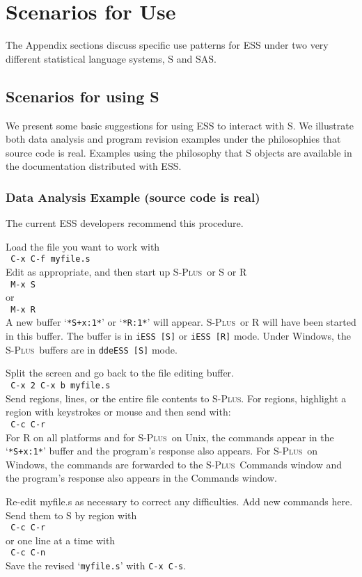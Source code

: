 \documentclass{article}
\newcommand*{\Splus}{\textsc{S-Plus}}
\newcommand{\stexttt}[1]{{\small\texttt{#1}}}
\newcommand{\elcode}[1]{\\{\stexttt{\hspace*{2em} #1}}\\}
\newcommand{\file}[1]{`\stexttt{#1}'}
\begin{document}


\appendix


\section{Scenarios for Use}
\label{app:scenarios}

The Appendix sections discuss specific use patterns for ESS under two very
different statistical language systems, S and SAS.

\subsection{Scenarios for using S}
\label{sec:S:scenarios}

We present some basic suggestions for using ESS to interact with S.
We illustrate both data analysis and program revision examples under
the philosophies that source code is real.
Examples using the philosophy that S objects are available in the documentation
distributed with ESS.

\subsubsection{Data Analysis Example (source code is real)}
The current ESS developers recommend this procedure.

\noindent
Load the file you want to work with
  \elcode{C-x C-f myfile.s}
Edit as appropriate, and then start up \Splus\ or S or R
  \elcode{M-x S}
or 
  \elcode{M-x R}
A new buffer \file{*S+x:1*} or \file{*R:1*} will appear.
\Splus\ or R will have been started
in this buffer.  The buffer is in \stexttt{iESS [S]} or \stexttt{iESS [R]} mode.
Under Windows, the \Splus\ buffers are in  \stexttt{ddeESS [S]} mode.

Split the screen and go back to the file editing buffer.
  \elcode{C-x 2 C-x b myfile.s}
Send regions, lines, or the entire file contents to \Splus.
For regions, highlight a region with keystrokes or mouse
and then send with:
  \elcode{C-c C-r}
For R on all platforms and for \Splus\ on Unix, the commands appear in
the \file{*S+x:1*} buffer and the program's response also appears.
For \Splus\ on Windows, the commands are forwarded to the \Splus\ Commands
window and the program's response also appears in the Commands window.

Re-edit myfile.s as necessary to correct any difficulties.  Add
new commands here.  Send them to S by region with
  \elcode{C-c C-r}
or one line at a time with
  \elcode{C-c C-n}
Save the revised \file{myfile.s} with \stexttt{C-x C-s}.
\end{document}

